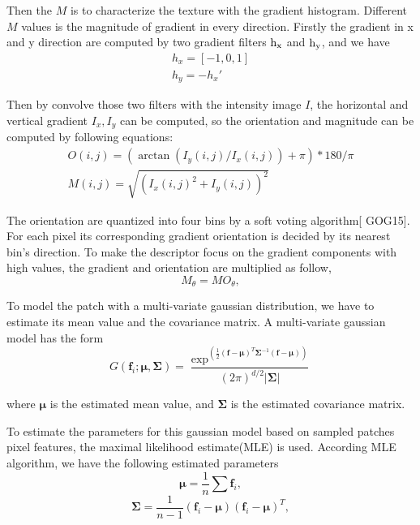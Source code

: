 Then the $M$ is to characterize the texture with the gradient histogram. Different $M$ values is the magnitude of gradient in every direction. 
Firstly the gradient in x and y direction are computed by two gradient filters $\rm{h}_x$ and $\rm{h}_y$, and we have 
\begin{equation}
\begin{aligned}
h_x = [-1, 0, 1]\\
h_y = -h_x'
\end{aligned}
\end{equation}

Then by convolve those two filters with the intensity image $I$, the horizontal and vertical gradient $I_x, I_y$ can be computed, so the orientation and magnitude can be computed by following equations:
\begin{equation}
\begin{aligned}
O(i,j) = (\arctan(I_y(i,j)/I_x(i,j))+\pi)*180 /{\pi} \\
M(i,j) = \sqrt{(I_x(i,j)^2 + I_y(i,j))^2}
\end{aligned}
\end{equation}

The orientation are quantized into four bins by a soft voting algorithm[ GOG15]. For each pixel its corresponding gradient orientation is decided by its nearest bin's direction. To make the descriptor focus on the gradient components with high values, the gradient and orientation are multiplied as follow,
\begin{equation}
M_{\theta} = MO_{\theta},
\end{equation}


To model the patch with a multi-variate gaussian distribution, we have to estimate its mean value and the covariance matrix. A multi-variate gaussian model has the form
\begin{equation}
G(\bm{f}_i;\bm{\mu},\bm{\Sigma}) = \frac{\exp^{(\frac{1}{2}(\bm{f}-\bm{\mu})^T\bm{\Sigma}^{-1}(\bm{f}-\bm{\mu}))}}{(2\pi)^{d/2}|{\bm{\Sigma|}}} 
\end{equation}

where $\bm {\mu}$ is the estimated mean value, and $\bm {\Sigma} $ is the estimated covariance matrix. 

To estimate the parameters for this gaussian model based on sampled patches pixel features, the maximal likelihood estimate(MLE) is used. According MLE algorithm, we have the following estimated parameters
\begin{equation}
\bm{\mu} = \frac{1}{n}\sum \bm{f}_i,
\end{equation}
\begin{equation}
\bm{\Sigma} = \frac{1}{n-1} (\bm{f}_i-\bm{\mu})(\bm{f}_i-\bm{\mu})^T,
\end{equation}


